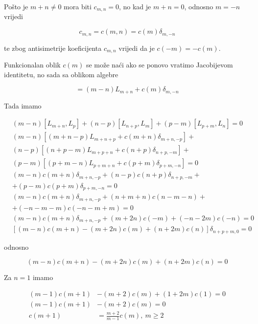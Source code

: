 \noindent Pošto je $m+n\neq 0$ mora biti $c_{m,n}=0$, no kad je $m+n=0$, odnosno $m=-n$ vrijedi 

\begin{equation}
c_{m,n}=c(m,n)=c(m)\delta_{m,-n}
\end{equation}

\noindent te zbog antisimetrije koeficijenta $c_{m,n}$ vrijedi da je $c(-m)=-c(m)$.

\noindent Funkcionalan oblik $c(m)$ se može naći ako se ponovo vratimo Jacobijevom identitetu, no sada sa oblikom algebre

\begin{equation}
[L_m,L_n]=(m-n)L_{m+n}+c(m)\delta_{m,-n}
\end{equation}

\noindent Tada imamo

\begin{equation*}
\begin{split}
&(m-n)[L_{m+n},L_p]+(n-p)[L_{n+p},L_m]+(p-m)[L_{p+m},L_n]=0\\[1ex]  
&(m-n)\left[(m+n-p)L_{m+n+p}+c(m+n)\delta_{m+n,-p}\right]+\\
&(n-p)\left[(n+p-m)L_{m+p+n}+c(n+p)\delta_{n+p,-m}\right]+\\
&(p-m)\left[(p+m-n)L_{p+m+n}+c(p+m)\delta_{p+m,-n}\right]=0\\[1ex] 
&(m-n)c(m+n)\delta_{m+n,-p}+(n-p)c(n+p)\delta_{n+p,-m}+\\
&+(p-m)c(p+m)\delta_{p+m,-n}=0\\[1ex] 
&(m-n)c(m+n)\delta_{m+n,-p}+(n+m+n)c(n-m-n)+\\
&+(-n-m-m)c(-n-m+m)=0\\[1ex] 
&(m-n)c(m+n)\delta_{m+n,-p}+(m+2n)c(-m)+(-n-2m)c(-n)=0\\[1ex] 
&\left[(m-n)c(m+n)-(m+2n)c(m)+(n+2m)c(n)\right]\delta_{n+p+m,0}=0
\end{split}
\end{equation*}

\noindent odnosno 

\begin{equation*}
(m-n)c(m+n)-(m+2n)c(m)+(n+2m)c(n)=0
\end{equation*}

\noindent Za $n=1$ imamo

\begin{equation*}
\begin{split}
(m-1)c(m+1)&-(m+2)c(m)+(1+2m)c(1)=0\\
(m-1)c(m+1)&-(m+2)c(m)=0\\
c(m+1)&=\frac{m+2}{m-1}c(m),\ m\ge 2
\end{split}
\end{equation*}


